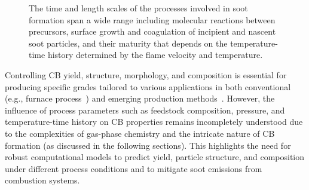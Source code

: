 \begin{figure}[H]
	\centering
	\caption{The time and length scales of the processes involved in soot formation span a wide range including molecular reactions between precursors, surface growth and coagulation of incipient and nascent soot particles, and their maturity that depends on the temperature-time history determined by the flame velocity and temperature.}
	\label{fig:sootscales}
\end{figure}



Controlling CB yield, structure, morphology, and composition is essential for producing specific grades tailored to various applications in both conventional (e.g., furnace process~\citep{dames2023plasma}) and emerging production methods~\citep{li2017experimental, fulcheri2023energy, patlolla2023review}. However, the influence of process parameters such as feedstock composition, pressure, and temperature-time history on CB properties remains incompletely understood due to the complexities of gas-phase chemistry and the intricate nature of CB formation (as discussed in the following sections). This highlights the need for robust computational models to predict yield, particle structure, and composition under different process conditions and to mitigate soot emissions from combustion systems.

